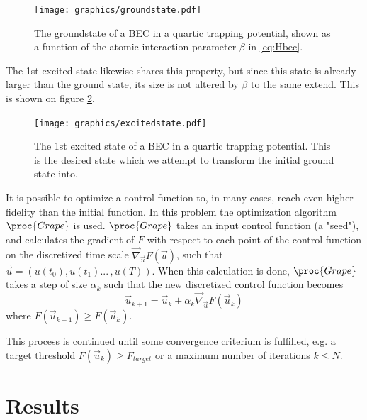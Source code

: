 \documentclass[aps,pra,reprint,superscriptaddress]{revtex4-1}
\begin{document}
\begin{figure}[h]
	\texttt{[image: graphics/groundstate.pdf]}
	\caption{The groundstate of a BEC in a quartic trapping potential, shown as a function of the atomic interaction parameter $\beta$ in \ref{eq:Hbec}.}
	\label{fig:BECgroundstate}
\end{figure}

The 1st excited state likewise shares this property, but since this state is already larger than the ground state, its size is not altered by $\beta$ to the same extend. This is shown on figure \ref{fig:BECexcitedstate}.

\begin{figure}
	\texttt{[image: graphics/excitedstate.pdf]}
	\caption{The 1st excited state of a BEC in a quartic trapping potential. This is the desired state which we attempt to transform the initial ground state into.}
	\label{fig:BECexcitedstate}
\end{figure}

It is possible to optimize a control function to, in many cases, reach even higher fidelity than the initial function. In this problem the optimization algorithm $\proc{Grape}$ is used. $\proc{Grape}$ takes an input control function (a "seed"), and calculates the gradient of $F$ with respect to each point of the control function on the discretized time scale $\vec{\nabla}_{\vec{u}}F(\vec{u})$, such that $\vec{u} = (u(t_0), u(t_1) ... \,, u(T))$. When this calculation is done, $\proc{Grape}$ takes a step of size $\alpha_k$ such that the new discretized control function becomes
\begin{equation}
	\vec{u}_{k+1} = \vec{u}_{k} + \alpha_k \vec{\nabla}_{\vec{u}}F(\vec{u}_k)
\end{equation}
where $F(\vec{u}_{k+1}) \geq F(\vec{u}_{k})$.

This process is continued until some convergence criterium is fulfilled, e.g. a target threshold $F(\vec{u}_{k}) \geq F_{target}$ or a maximum number of iterations $k \leq N$.


\section{\label{sec:results}Results}

\end{document}
